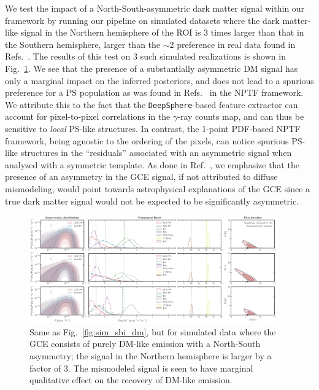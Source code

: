 \documentclass[prd,aps,10pt,nofootinbib,twocolumn,superscriptaddress,preprintnumbers,balancelastpage,longbibliography]{revtex4-1}
\begin{document}
We test the impact of a North-South-asymmetric dark matter signal within our framework by running our pipeline on simulated datasets where the dark matter-like signal in the Northern hemisphere of the ROI is 3 times larger than that in the Southern hemisphere, larger than the $\sim 2$ preference in real data found in Refs.~\cite{Leane:2020nmi,Leane:2020pfc}. The results of this test on 3 such simulated realizations is shown in Fig.~\ref{fig:sim_sbi_dm_asym}. We see that the presence of a substantially asymmetric DM signal has only a marginal impact on the inferred posteriors, and does not lead to a spurious preference for a PS population as was found in Refs.~\cite{Leane:2020nmi,Leane:2020pfc} in the NPTF framework. We attribute this to the fact that the \texttt{DeepSphere}-based feature extractor can account for pixel-to-pixel correlations in the $\gamma$-ray counts map, and can thus be sensitive to \emph{local} PS-like structures. In contrast, the 1-point PDF-based NPTF framework, being agnostic to the ordering of the pixels, can notice spurious PS-like structures in the ``residuals'' associated with an asymmetric signal when analyzed with a symmetric template.
As done in Ref.~\cite{Buschmann:2020adf}, we emphasize that the presence of an asymmetry in the GCE signal, if not attributed to diffuse mismodeling, would point towards astrophysical explanations of the GCE since a true dark matter signal would not be expected to be significantly asymmetric.

%
\begin{figure}
    \centering
    \includegraphics[width=0.95\textwidth]{plots/sim_sbi_dm_asym.pdf}
    \caption{Same as Fig.~\ref{fig:sim_sbi_dm}, but for simulated data where the GCE consists of purely DM-like emission with a North-South asymmetry; the signal in the Northern hemisphere is larger by a factor of 3. The mismodeled signal is seen to have marginal qualitative effect on the recovery of DM-like emission.}
    \label{fig:sim_sbi_dm_asym}
\end{figure}
%
\end{document}
